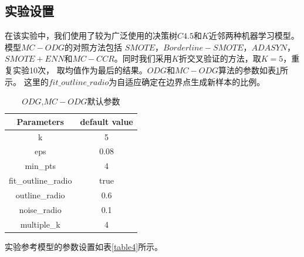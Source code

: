 \documentclass{article}
\begin{document}
\subsection{实验设置}
在该实验中，我们使用了较为广泛使用的决策树$C4.5$和$K$近邻两种机器学习模型。模型$MC-ODG$的对照方法包括
$SMOTE$，$Borderline-SMOTE$，$ADASYN$，$SMOTE+ENN$和$MC-CCR$。同时我们采用$K$折交叉验证的方法，取$K=5$，重复实验10次，
取均值作为最后的结果。$ODG$和$MC-ODG$算法的参数如表\ref{table6}所示。
这里的$fit\_outline\_radio$为自适应确定在边界点生成新样本的比例。
\begin{table}[]
  \caption{$ODG$,$MC-ODG$默认参数}
  \label{table6}
  \begin{tabular}{@{}cc@{}}
  \toprule
  Parameters          & default value \\ \midrule
  k                   & 5             \\
  eps                 & 0.08          \\
  min\_pts            & 4             \\
  fit\_outline\_radio & true          \\
  outline\_radio      & 0.6           \\
  noise\_radio        & 0.1           \\
  multiple\_k         & 4             \\ \bottomrule
  \end{tabular}
  \end{table}
实验参考模型的参数设置如表\ref{table4}所示。
\end{document}

